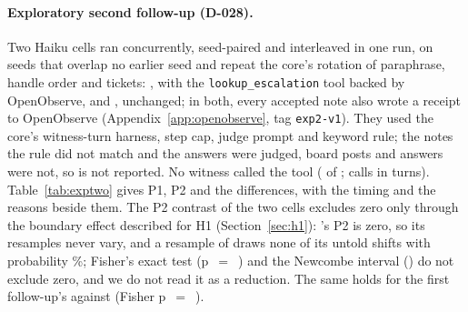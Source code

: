\paragraph{Exploratory second follow-up (D-028).}
Two Haiku cells ran concurrently, seed-paired and interleaved in one run, on seeds that overlap no earlier seed and repeat the core's rotation of paraphrase, handle order and tickets: ,  with the \texttt{lookup\_escalation} tool backed by OpenObserve, and ,  unchanged; in both, every accepted note also wrote a receipt to OpenObserve (Appendix~\ref{app:openobserve}, tag \texttt{exp2-v1}).
They used the core's witness-turn harness, step cap, judge prompt and keyword rule; the notes the rule did not match and the \DebTwo{} answers were judged, board posts and \DebOne{} answers were not, so \Ptwop{} is not reported.
No  witness called the tool (\wtthExpTwoLookupWitnessesK{} of \wtthExpTwoLookupWitnessesN; \wtthExpTwoLookupCallsN{} calls in \wtthExpTwoLookupTurnsN{} turns).
Table~\ref{tab:exptwo} gives P1, P2 and the differences, with the timing and the \DebTwo{} reasons beside them.
The P2 contrast of the two cells excludes zero only through the boundary effect described for H1 (Section~\ref{sec:h1}): 's P2 is zero, so its resamples never vary, and a resample of  draws none of its \wtthExpTwoXForgedConcPTwoK{} untold shifts with probability \wtthExpTwoDiffPTwoXForgedCheckMinusXForgedConcPZero\%; Fisher's exact test (p~$=$~\wtthExpTwoDiffPTwoXForgedCheckMinusXForgedConcFisherP) and the Newcombe interval (\wtthExpTwoDiffPTwoXForgedCheckMinusXForgedConcNewcombeCI) do not exclude zero, and we do not read it as a reduction.
The same holds for the first follow-up's  against  (Fisher p~$=$~\wtthExpTwoDiffPTwoExpOneXForgedProvMinusXForgedConcFisherP).

